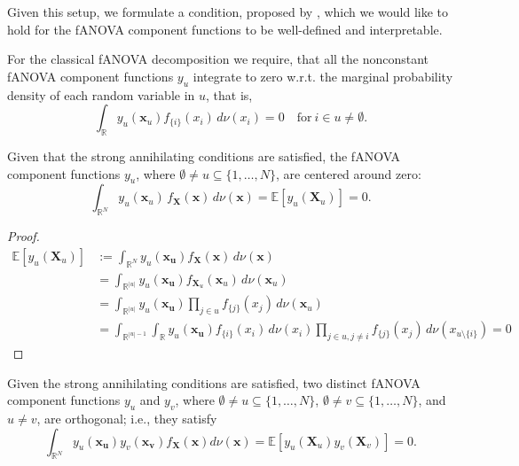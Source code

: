 Given this setup, we formulate a condition, proposed by \cite{rahman2014}, which we would like to hold for the fANOVA component functions to be well-defined and interpretable.
\begin{condition}\label{cond:strong_annihilating_conditions}
    For the classical fANOVA decomposition we require, that all the nonconstant fANOVA component functions $y_u$ integrate to zero w.r.t. the marginal probability density of each random variable in $u$, that is,
\begin{equation}
    \int_{\mathbb{R}} y_u(\boldsymbol{x}_u) f_{\{i\}}(x_i) \, d\nu(x_i) = 0 \quad \text{for} \ i \in u \neq \emptyset.
\end{equation}
\end{condition}

\begin{proposition}\label{prop:zero_mean_classical}
Given that the strong annihilating conditions are satisfied, 
the fANOVA component functions $y_u$, where 
$\emptyset \neq u \subseteq \{1,\dots,N\}$, are centered around zero:
\begin{equation}
    \int_{\mathbb{R}^N} 
        y_u(\boldsymbol{x}_u)\, f_{\boldsymbol{X}}(\boldsymbol{x}) 
        \, d\nu (\boldsymbol{x})
    = \mathbb{E}[y_u(\boldsymbol{X}_u)] 
    = 0.
\end{equation}
\end{proposition}

\begin{proof}
\begin{align*}
    \mathbb{E}[y_u(\boldsymbol{X}_u)] &:= \int_{\mathbb{R}^{N}} y_u(\boldsymbol{x_u}) f_{\boldsymbol{X}}(\boldsymbol{x}) \, d\nu (\boldsymbol{x}) \\[0.5em]
    &= \int_{\mathbb{R}^{|u|}} y_u(\boldsymbol{x_u}) f_{\boldsymbol{X}_u}(\boldsymbol{x}_u) \, d\nu (\boldsymbol{x}_u) \\[0.5em]
    &= \int_{\mathbb{R}^{|u|}} y_u(\boldsymbol{x_u}) \prod_{j \in u} f_{\{j\}}(x_j) \, d\nu (\boldsymbol{x}_u) \\[0.5em]
    &= \int_{\mathbb{R}^{|u|-1}} \int_{\mathbb{R}} y_u(\boldsymbol{x_u}) f_{\{i\}}(x_i) \, d\nu(x_i) \prod_{j \in u, j \neq i} f_{\{j\}}(x_j) \, d\nu (x_{u \setminus \{i\}}) = 0
\end{align*}
\end{proof}

\begin{proposition}\label{prop:orthogonality_classical}
    Given the strong annihilating conditions are satisfied, two distinct fANOVA component functions $y_u$ and $y_v$, where $\emptyset \neq u \subseteq \{1,\ldots,N\}$, $\emptyset \neq v \subseteq \{1,\ldots,N\}$, and $u \neq v$, are orthogonal; i.e., they satisfy
\begin{equation}
    \int_{\mathbb{R}^N} y_u(\boldsymbol{x_u}) y_v(\boldsymbol{x_v}) f_{\boldsymbol{X}}(\boldsymbol{x}) d\nu (\boldsymbol{x}) = \mathbb{E}[y_u(\boldsymbol{X}_u) y_v(\boldsymbol{X}_v)] = 0.
\end{equation}
\end{proposition}


